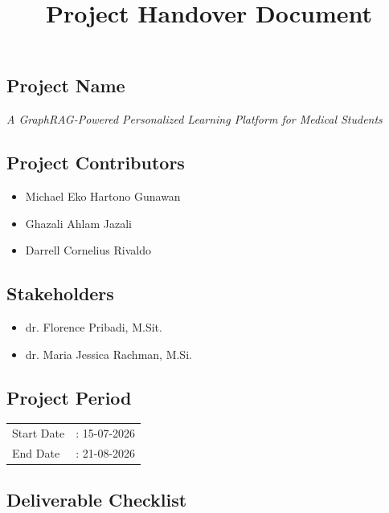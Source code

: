 \documentclass[11pt,a4paper]{article}
\title{
    \fontsize{36pt}{42pt}\selectfont\bfseries Project Handover Document
}
\date{}
\begin{document}
\maketitle


\subsection*{Project Name}

{\Large \textit{A GraphRAG-Powered Personalized Learning Platform for Medical Students}}

\subsection*{Project Contributors}

\begin{itemize}[leftmargin=*]
    \item Michael Eko Hartono Gunawan
    \item Ghazali Ahlam Jazali
    \item Darrell Cornelius Rivaldo
\end{itemize}

\subsection*{Stakeholders}

\begin{itemize}[leftmargin=*]
    \item dr. Florence Pribadi, M.Sit.
    \item dr. Maria Jessica Rachman, M.Si.
\end{itemize}

\subsection*{Project Period}

\begin{tabular}{ll}
Start Date & : 15-07-2026 \\
End Date & : 21-08-2026
\end{tabular}

\subsection*{Deliverable Checklist}
\end{document}

